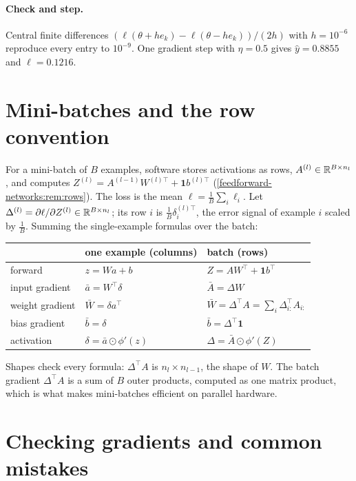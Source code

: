 \begin{notechapter}
\paragraph{Check and step.} Central finite differences
$(\ell(\theta + h e_k) - \ell(\theta - he_k))/(2h)$ with $h = 10^{-6}$ reproduce every entry to $10^{-9}$. One gradient step with
$\eta = 0.5$ gives $\hat y = 0.8855$ and $\ell = 0.1216$.

\section{Mini-batches and the row convention}\label{backpropagation:sec:batch}

For a mini-batch of $B$ examples, software stores activations as rows,
$A^{(l)}\in\mathbb{R}^{B\times n_l}$, and computes $Z^{(l)} = A^{(l-1)}W^{(l)\top} + \mathbf 1b^{(l)\top}$ (\cref{feedforward-networks:rem:rows}). The
loss is the mean $\ell = \frac1B\sum_i\ell_i$. Let $\Delta^{(l)} = \partial\ell/\partial Z^{(l)}\in\mathbb{R}^{B\times n_l}$; its row $i$ is $\frac1B\delta^{(l)\top}_i$, the
error signal of example $i$ scaled by $\frac1B$. Summing the single-example formulas over the
batch:

\begin{center}
\begin{tabular}{lll}
\toprule
& one example (columns) & batch (rows) \\
\midrule
forward & $z = Wa + b$ & $Z = AW^\top + \mathbf 1b^\top$ \\
input gradient & $\bar a = W^\top\delta$ & $\bar A = \Delta W$ \\
weight gradient & $\bar W = \delta a^\top$ & $\bar W = \Delta^\top A = \sum_i\Delta_{i:}^\top A_{i:}$ \\
bias gradient & $\bar b = \delta$ & $\bar b = \Delta^\top\mathbf 1$ \\
activation & $\delta = \bar a\odot\phi'(z)$ & $\Delta = \bar A\odot\phi'(Z)$ \\
\bottomrule
\end{tabular}
\end{center}

Shapes check every formula: $\Delta^\top A$ is $n_l\times n_{l-1}$, the shape of $W$. The batch gradient
$\Delta^\top A$ is a sum of $B$ outer products, computed as one matrix product, which is what makes
mini-batches efficient on parallel hardware.

\section{Checking gradients and common mistakes}\label{backpropagation:sec:pitfalls}


\end{notechapter}
